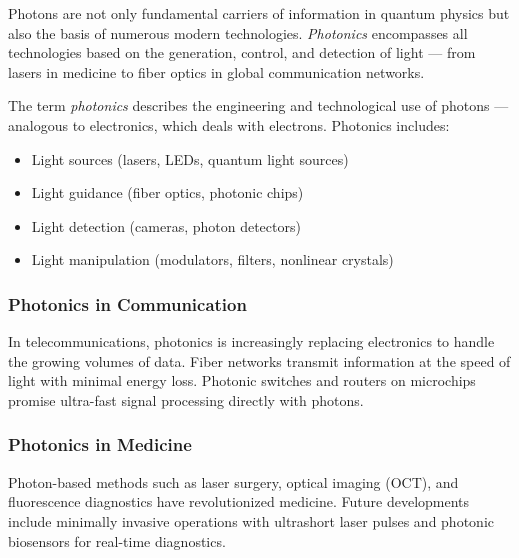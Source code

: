 Photons are not only fundamental carriers of information in quantum physics but also the basis of numerous modern technologies.  
\emph{Photonics} encompasses all technologies based on the generation, control, and detection of light — from lasers in medicine to fiber optics in global communication networks.
\vspace{1em}
\begin{tcolorbox}[hinweisbox, title=What Does “Photonics” Mean? \label{box:photonics_definition}]
	\small
	The term \emph{photonics} describes the engineering and technological use of photons — analogous to electronics, which deals with electrons.  
	Photonics includes:
	\begin{itemize}
		\item Light sources (lasers, LEDs, quantum light sources)
		\item Light guidance (fiber optics, photonic chips)
		\item Light detection (cameras, photon detectors)
		\item Light manipulation (modulators, filters, nonlinear crystals)
	\end{itemize}
\end{tcolorbox}

\subsubsection{Photonics in Communication}

In telecommunications, photonics is increasingly replacing electronics to handle the growing volumes of data. Fiber networks transmit information at the speed of light with minimal energy loss.  
Photonic switches and routers on microchips promise ultra-fast signal processing directly with photons.

\subsubsection{Photonics in Medicine}

Photon-based methods such as laser surgery, optical imaging (OCT), and fluorescence diagnostics have revolutionized medicine.  
Future developments include minimally invasive operations with ultrashort laser pulses and photonic biosensors for real-time diagnostics.

